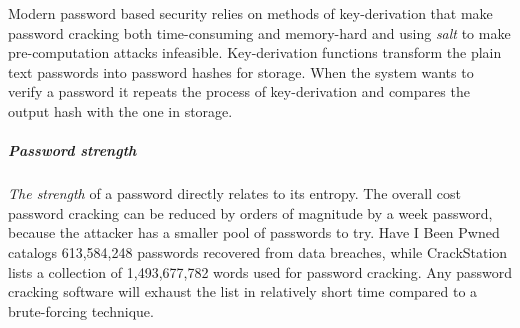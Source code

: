 Modern password based security relies on methods of key-derivation that make password cracking both time-consuming and memory-hard \cite{percival2016scrypt, biryukov2016argon2, boneh2016balloon} and using \textit{salt} \cite{hornby2016salted} to make pre-computation attacks infeasible.
Key-derivation functions transform the plain text passwords into password hashes for storage.
When the system wants to verify a password it repeats the process of key-derivation and compares the output hash with the one in storage.

\subparagraph{Password strength}
\textit{The strength} of a password directly relates to its entropy. The overall cost password cracking can be reduced by orders of magnitude by a week password, because the attacker has a smaller pool of passwords to try.
Have I Been Pwned \cite{hunt2021have} catalogs 613,584,248 passwords recovered from data breaches, while CrackStation \cite{hornby2019password} lists a collection of 1,493,677,782 words used for password cracking. Any password cracking software will exhaust the list in relatively short time compared to a brute-forcing technique.








